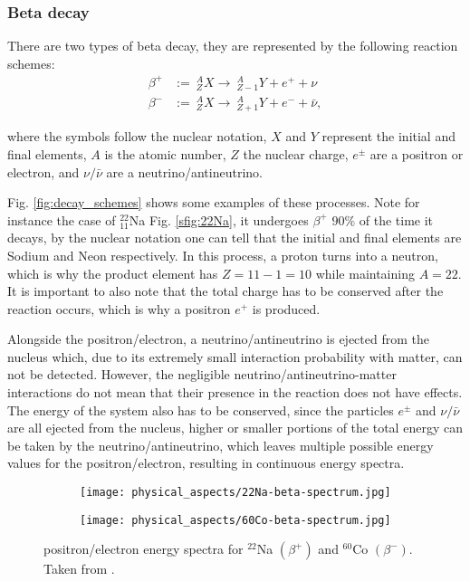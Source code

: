 \subsubsection{Beta decay} \label{sec:beta_decay}

There are two types of beta decay, they are represented by the following reaction schemes:
\begin{align}
  \beta^+ &:=~ ^A_ZX \rightarrow ~ ^A_{Z-1}Y + e^+ + \nu \\
  \beta^- &:=~ ^A_ZX \rightarrow ~ ^A_{Z+1}Y + e^- + \bar{\nu},
\end{align}

where the symbols follow the nuclear notation, $X$ and $Y$ represent the initial and final elements, $A$ is the atomic number, $Z$ the nuclear charge, $e^{\pm}$ are a positron or electron, and $\nu/\bar{\nu}$ are a neutrino/antineutrino.

Fig. \ref{fig:decay_schemes} shows some examples of these processes. Note for instance the case of $^{22}_{11}$Na Fig. \ref{sfig:22Na}, it undergoes $\beta^+$ $90\%$ of the time it decays, by the nuclear notation one can tell that the initial and final elements are Sodium and Neon respectively. In this process, a proton turns into a neutron, which is why the product element has $Z=11-1=10$ while maintaining $A=22$. It is important to also note that the total charge has to be conserved after the reaction occurs, which is why a positron $e^+$ is produced.

Alongside the positron/electron, a neutrino/antineutrino is ejected from the nucleus which, due to its extremely small interaction probability with matter, can not be detected. However, the negligible neutrino/antineutrino-matter interactions do not mean that their presence in the reaction does not have effects. The energy of the system also has to be conserved, since the particles $e^{\pm}$ and $\nu/\bar{\nu}$ are all ejected from the nucleus, higher or smaller portions of the total energy can be taken by the neutrino/antineutrino, which leaves multiple possible energy values for the positron/electron, resulting in continuous energy spectra.

\begin{figure}[H]
    \centering
    \begin{subfigure}[t]{0.45\textwidth}
      \texttt{[image: physical\_aspects/22Na-beta-spectrum.jpg]}
      \caption{\label{sfig:22Na_beta_spectra}}
    \end{subfigure}
    \begin{subfigure}[t]{0.45\textwidth}
      \texttt{[image: physical\_aspects/60Co-beta-spectrum.jpg]}
      \caption{\label{sfig:60Co_beta_spectra}}
    \end{subfigure}
    \caption{\label{fig:beta_spectra}positron/electron energy spectra for   $^{22}$Na $(\beta^+)$ and   $^{60}$Co $(\beta^-)$. Taken from \cite{IAEA}.}
\end{figure}

